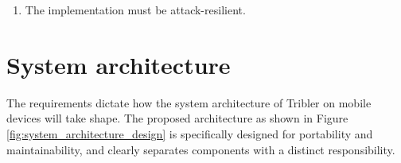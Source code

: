 \begin{enumerate}[label=B\arabic*.,ref=B\arabic*]
	\item \label{rq:AttackResilient} The implementation must be attack-resilient.
	
\end{enumerate}




\section{System architecture}
The requirements dictate how the system architecture of Tribler on mobile devices will take shape.
The proposed architecture as shown in Figure \ref{fig:system_architecture_design} is specifically designed for portability and maintainability, and clearly separates components with a distinct responsibility.


